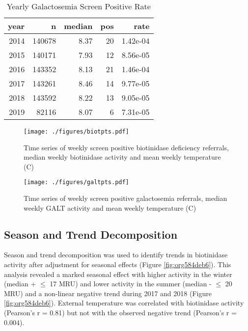 \documentclass[review]{elsarticle}
\begin{document}
\begin{table}[ht]
\centering
\begin{tabular}{rrrrr}
  \hline
year & n & median & pos & rate \\ 
  \hline
2014 & 140678 & 8.37 &  20 & 1.42e-04 \\ 
  2015 & 140171 & 7.93 &  12 & 8.56e-05 \\ 
  2016 & 143352 & 8.13 &  21 & 1.46e-04 \\ 
  2017 & 143261 & 8.46 &  14 & 9.77e-05 \\ 
  2018 & 143592 & 8.22 &  13 & 9.05e-05 \\ 
  2019 & 82116 & 8.07 &   6 & 7.31e-05 \\ 
   \hline
\end{tabular}
\caption{Yearly Galactosemia Screen Positive Rate} 
\label{tab:galt_year}
\end{table}

\begin{figure}[htbp]
\centering
\texttt{[image: ./figures/biotpts.pdf]}
\caption{\label{fig:orgbba20ce}Time series of weekly screen positive biotinidase deficiency referrals, median weekly biotinidase activity and mean weekly temperature (\degree{}C)}
\end{figure}

\begin{figure}[htbp]
\centering
\texttt{[image: ./figures/galtpts.pdf]}
\caption{\label{fig:orgc17ec7c}Time series of weekly screen positive galactosemia referrals, median weekly GALT activity and mean weekly temperature (\degree{}C)}
\end{figure}

\clearpage

\subsection*{Season and Trend Decomposition}
\label{sec:org9591fea}
Season and trend decomposition was used to identify trends in
biotinidase activity after adjustment for seasonal effects (Figure
\ref{fig:org584deb6}). This analysis revealed a marked seasonal effect with
higher activity in the winter (median + \(\le\) 17 MRU) and lower activity
in the summer (median - \(\le\) 20 MRU) and a non-linear negative trend
during 2017 and 2018 (Figure \ref{fig:org584deb6}). External temperature was
correlated with biotinidase activity (Pearson's r = 0.81) but not with
the observed negative trend (Pearson's r = 0.004).
\end{document}
